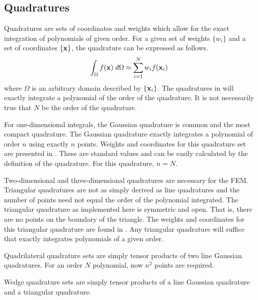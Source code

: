   \subsection{Quadratures}
    \label{sec:quadratures}
    Quadratures are sets of coordinates and weights which allow for the exact 
    integration of polynomials of given order. For a given set of weights 
    $\{w_i\}$ and a set of coordinates $\{\mathbf{x}\}$, the quadrature can be 
    expressed as follows.
    \begin{equation}
      \label{eq:quadrature}
      \int_{\Omega} f(\mathbf{x}) \;d\Omega \approx \sum_{i=1}^{N} w_i f(\mathbf{x}_i)
    \end{equation}
    where $\Omega$ is an arbitrary domain described by $\{\mathbf{x}_i\}$. The 
    quadratures in  will exactly integrate a polynomial of
    the order of the quadrature. It is not necessarily true that $N$ be the 
    order of the quadrature.
    
    For one-dimensional integrals, the Gaussian quadrature is common and the 
    most compact quadrature. The Gaussian quadrature exactly integrates a 
    polynomial of order $n$ using exactly $n$ points. Weights and coordinates
    for this quadrature set are presented in \cite{gaussianQuadrature}. These
    are standard values and can be easily calculated by the definition of the
    quadrature. For this quadrature, $n=N$.
    
    Two-dimensional and three-dimensional quadratures are necessary for the 
    FEM. Triangular quadratures are not as simply derived 
    as line quadratures and the number of points need not equal the order of the
    polynomial integrated. The triangular quadrature as implemented here is 
    symmetric and open. That is, there are no points on the boundary of the 
    triangle. The weights and coordinates for this triangular quadrature are 
    found in \cite{triangleQuadrature}. Any triangular quadrature will suffice
    that exactly integrates polynomials of a given order.
    
    Quadrilateral quadrature sets are simply tensor products of two line 
    Gaussian quadratures. For an order $N$ polynomial, now $n^2$ points are 
    required. 
    
    Wedge quadrature sets are simply tensor products of a line Gaussian 
    quadrature and a triangular quadrature. 
    

